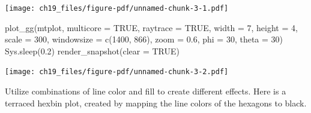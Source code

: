 \documentclass[
  letterpaper,
]{scrbook}
\newenvironment{Shaded}{\begin{snugshade}}{\end{snugshade}}
\newcommand{\AttributeTok}[1]{\textcolor[rgb]{0.40,0.45,0.13}{#1}}
\newcommand{\ConstantTok}[1]{\textcolor[rgb]{0.56,0.35,0.01}{#1}}
\newcommand{\DecValTok}[1]{\textcolor[rgb]{0.68,0.00,0.00}{#1}}
\newcommand{\FloatTok}[1]{\textcolor[rgb]{0.68,0.00,0.00}{#1}}
\newcommand{\FunctionTok}[1]{\textcolor[rgb]{0.28,0.35,0.67}{#1}}
\newcommand{\NormalTok}[1]{\textcolor[rgb]{0.00,0.23,0.31}{#1}}
\begin{document}
\texttt{[image: ch19\_files/figure-pdf/unnamed-chunk-3-1.pdf]}

\begin{Shaded}
\begin{Highlighting}[]
\FunctionTok{plot\_gg}\NormalTok{(mtplot, }\AttributeTok{multicore =} \ConstantTok{TRUE}\NormalTok{, }\AttributeTok{raytrace =} \ConstantTok{TRUE}\NormalTok{, }\AttributeTok{width =} \DecValTok{7}\NormalTok{, }\AttributeTok{height =} \DecValTok{4}\NormalTok{, }
        \AttributeTok{scale =} \DecValTok{300}\NormalTok{, }\AttributeTok{windowsize =} \FunctionTok{c}\NormalTok{(}\DecValTok{1400}\NormalTok{, }\DecValTok{866}\NormalTok{), }\AttributeTok{zoom =} \FloatTok{0.6}\NormalTok{, }\AttributeTok{phi =} \DecValTok{30}\NormalTok{, }\AttributeTok{theta =} \DecValTok{30}\NormalTok{)}
\FunctionTok{Sys.sleep}\NormalTok{(}\FloatTok{0.2}\NormalTok{)}
\FunctionTok{render\_snapshot}\NormalTok{(}\AttributeTok{clear =} \ConstantTok{TRUE}\NormalTok{)}
\end{Highlighting}
\end{Shaded}

\texttt{[image: ch19\_files/figure-pdf/unnamed-chunk-3-2.pdf]}

Utilize combinations of line color and fill to create different effects.
Here is a terraced hexbin plot, created by mapping the line colors of
the hexagons to black.
\end{document}
